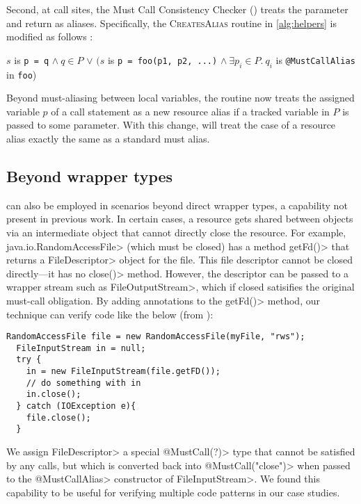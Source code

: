 Second, at call sites, the Must Call Consistency Checker
() treats the \mccannot parameter and return as
aliases.  Specifically, the \textsc{CreatesAlias} routine in \cref{alg:helpers} is
modified as follows :
\begin{algorithmic}
    \State \Return $s$ is \lstinline{p = q} $\wedge\ q \in P$ \newline
         \hspace*{4.5em} $\vee$ $(s$ is \lstinline{p = foo(p1, p2, ...)} \newline
         \hspace*{6em} $\wedge\ \exists p_i \in P.\ q_i$ is
         \lstinline{@MustCallAlias} in \lstinline{foo})
    \EndProcedure
\end{algorithmic}
Beyond must-aliasing between local variables, the routine now treats the
assigned variable $p$ of a call statement as a new resource alias if a tracked
variable in $P$ is passed to some \mccannot parameter.
With this change,  will treat the case of a
resource alias exactly the same as a standard must alias.

\subsection{Beyond wrapper types}

\mccannot can also be employed in scenarios beyond direct wrapper types, a
capability not present in previous work.  In certain cases, a resource gets
shared between objects via an intermediate object that cannot directly close the
resource.  For example, \<java.io.RandomAccessFile> (which must be closed) has
a method \<getFd()> that returns a \<FileDescriptor>
object for the file. This file
descriptor cannot be closed directly---it has no \<close()> method.
However, the descriptor can be passed to a wrapper stream such as
\<FileOutputStream>, which if closed satisifies the original must-call
obligation.  By adding \mccannot annotations to the \<getFd()> method, our
technique can verify code like the below (from ):
\begin{lstlisting}[frame=tb,belowskip=3mm]
  RandomAccessFile file = new RandomAccessFile(myFile, "rws");
  FileInputStream in = null;
  try {
    in = new FileInputStream(file.getFD());
    // do something with in  
    in.close();
  } catch (IOException e){
    file.close();
  }
\end{lstlisting}
We assign \<FileDescriptor> a special \<@MustCall(?)> type that cannot be satisfied by any calls,
but which is converted back into \<@MustCall("close")> when passed to the \<@MustCallAlias> constructor
of \<FileInputStream>. We found this capability to be
useful for verifying multiple code patterns in our case studies.

